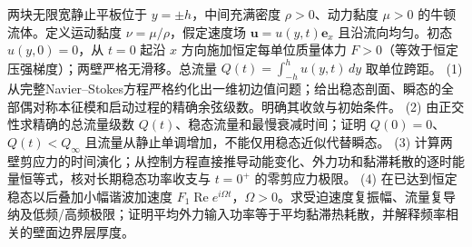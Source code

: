 两块无限宽静止平板位于 \(y=\pm h\)，中间充满密度 \(\rho>0\)、动力黏度 \(\mu>0\) 的牛顿流体。定义运动黏度 \(\nu=\mu/\rho\)，假定速度场 \(\boldsymbol u=u(y,t)\boldsymbol e_x\) 且沿流向均匀。初态 \(u(y,0)=0\)，从 \(t=0\) 起沿 \(x\) 方向施加恒定每单位质量体力 \(F>0\)（等效于恒定压强梯度）；两壁严格无滑移。总流量 \(Q(t)=\int_{-h}^{h}u(y,t)\,dy\) 取单位跨距。
(1) 从完整Navier--Stokes方程严格约化出一维初边值问题；给出稳态剖面、瞬态的全部偶对称本征模和启动过程的精确余弦级数。明确其收敛与初始条件。
(2) 由正交性求精确的总流量级数 \(Q(t)\)、稳态流量和最慢衰减时间；证明 \(Q(0)=0\)、\(Q(t)<Q_\infty\) 且流量从静止单调增加，不能仅用稳态近似代替瞬态。
(3) 计算两壁剪应力的时间演化；从控制方程直接推导动能变化、外力功和黏滞耗散的逐时能量恒等式，核对长期稳态功率收支与 \(t=0^+\) 的零剪应力极限。
(4) 在已达到恒定稳态以后叠加小幅谐波加速度 \(F_1\operatorname{Re}e^{i\Omega t}\)，\(\Omega>0\)。求受迫速度复振幅、流量复导纳及低频/高频极限；证明平均外力输入功率等于平均黏滞热耗散，并解释频率相关的壁面边界层厚度。